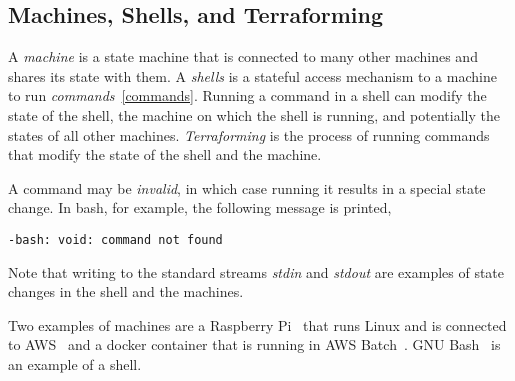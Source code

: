 \subsection{Machines, Shells, and Terraforming}
\label{machine}

A \emph{machine} is a state machine that is connected to many other machines and shares its state with them. A \emph{shells} is a stateful access mechanism to a machine to run \emph{commands}~\ref{commands}. Running a command in a shell can modify the state of the shell, the machine on which the shell is running, and potentially the states of all other machines. \emph{Terraforming} is the process of running commands that modify the state of the shell and the machine. 

A command may be \emph{invalid}, in which case running it results in a special state change. In bash, for example, the following message is printed,

\begin{verbatim}
-bash: void: command not found
\end{verbatim}

Note that writing to the standard streams \emph{stdin} and \emph{stdout} are examples of state changes in the shell and the machines. 

Two examples of machines are a Raspberry Pi~\cite{RaspberryPi} that runs Linux and is connected to AWS~\cite{AWS} and a docker container that is running in AWS Batch~\cite{AWSBatch}. GNU Bash~\cite{bash} is an example of a shell.